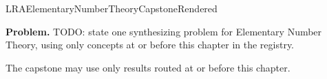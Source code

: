\ifcsname LRAElementaryNumberTheoryCapstoneRendered\endcsname
\else
\expandafter\gdef\csname LRAElementaryNumberTheoryCapstoneRendered\endcsname{}

\newpage
{}
\label{cap:elementary-number-theory}

\begin{tcolorbox}[
  colback=gray!6,
  colframe=gray!40,
  arc=2pt,
  left=8pt, right=8pt, top=6pt, bottom=6pt,
  title={\small\textbf{Capstone Problem}},
  fonttitle=\small\bfseries
]
\textbf{Problem.}
TODO: state one synthesizing problem for Elementary Number Theory, using only concepts at or
before this chapter in the registry.
\end{tcolorbox}

\begin{remark*}
The capstone may use only results routed at or before this chapter.
\end{remark*}

\clearpage
\fi
